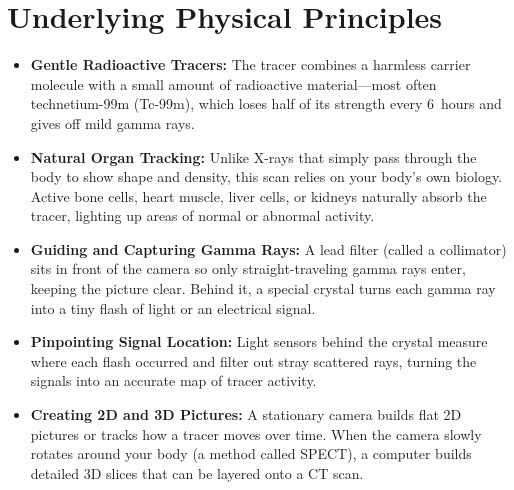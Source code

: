 \section{Underlying Physical Principles}
\begin{itemize}
\item \textbf{Gentle Radioactive Tracers:} The tracer combines a harmless carrier molecule with a small amount of radioactive material---most often technetium-99m (Tc-99m), which loses half of its strength every 6~hours and gives off mild gamma rays.
\item \textbf{Natural Organ Tracking:} Unlike X-rays that simply pass through the body to show shape and density, this scan relies on your body's own biology. Active bone cells, heart muscle, liver cells, or kidneys naturally absorb the tracer, lighting up areas of normal or abnormal activity.
\item \textbf{Guiding and Capturing Gamma Rays:} A lead filter (called a collimator) sits in front of the camera so only straight-traveling gamma rays enter, keeping the picture clear. Behind it, a special crystal turns each gamma ray into a tiny flash of light or an electrical signal.
\item \textbf{Pinpointing Signal Location:} Light sensors behind the crystal measure where each flash occurred and filter out stray scattered rays, turning the signals into an accurate map of tracer activity.
\item \textbf{Creating 2D and 3D Pictures:} A stationary camera builds flat 2D pictures or tracks how a tracer moves over time. When the camera slowly rotates around your body (a method called SPECT), a computer builds detailed 3D slices that can be layered onto a CT scan.
\end{itemize}

